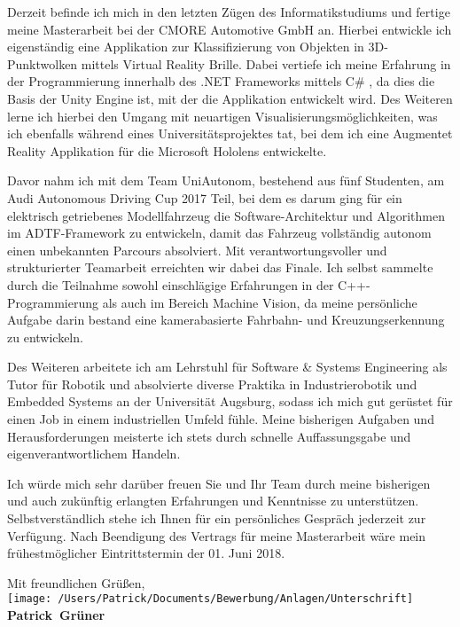 \documentclass[10pt,a4paper]{article}
\def\firstname{Patrick}
\def\familyname{Grüner}
\begin{document}
Derzeit befinde ich mich in den letzten Zügen des Informatikstudiums und fertige meine Masterarbeit bei der CMORE Automotive GmbH an. Hierbei entwickle ich eigenständig eine Applikation zur Klassifizierung von Objekten in 3D-Punktwolken mittels Virtual Reality Brille. Dabei vertiefe ich meine Erfahrung in der Programmierung innerhalb des .NET Frameworks mittels C\# , da dies die Basis der Unity Engine ist, mit der die Applikation entwickelt wird. Des Weiteren lerne ich hierbei den Umgang mit neuartigen Visualisierungsmöglichkeiten, was ich ebenfalls während eines Universitätsprojektes tat, bei dem ich eine Augmentet Reality Applikation für die Microsoft Hololens entwickelte.

Davor nahm ich mit dem Team UniAutonom, bestehend aus fünf Studenten, am Audi Autonomous Driving Cup 2017 Teil, bei dem es darum ging für ein elektrisch getriebenes Modellfahrzeug die Software-Architektur und Algorithmen im ADTF-Framework zu entwickeln, damit das Fahrzeug vollständig autonom einen unbekannten Parcours absolviert. Mit verantwortungsvoller und strukturierter Teamarbeit erreichten wir dabei das Finale. Ich selbst sammelte durch die Teilnahme sowohl einschlägige Erfahrungen in der C++-Programmierung als auch im Bereich Machine Vision, da meine persönliche Aufgabe darin bestand eine kamerabasierte Fahrbahn- und Kreuzungserkennung zu entwickeln.

Des Weiteren arbeitete ich am Lehrstuhl für Software \& Systems Engineering als Tutor für Robotik und absolvierte diverse Praktika in Industrierobotik und Embedded Systems an der Universität Augsburg, sodass ich mich gut gerüstet für einen Job in einem industriellen Umfeld fühle. Meine bisherigen Aufgaben und Herausforderungen meisterte ich stets durch schnelle Auffassungsgabe und eigenverantwortlichem Handeln.

Ich würde mich sehr darüber freuen Sie und Ihr Team durch meine bisherigen und auch zukünftig erlangten Erfahrungen und Kenntnisse zu unterstützen. Selbstverständlich stehe ich Ihnen für ein persönliches Gespräch jederzeit zur Verfügung. Nach Beendigung des Vertrags für meine Masterarbeit wäre mein frühestmöglicher Eintrittstermin der 01. Juni 2018.
  
Mit freundlichen Grüßen,\\[3em]

\texttt{[image: /Users/Patrick/Documents/Bewerbung/Anlagen/Unterschrift]}\\
{\bfseries \firstname~\familyname}\\
%
\vfill%
\end{document}
